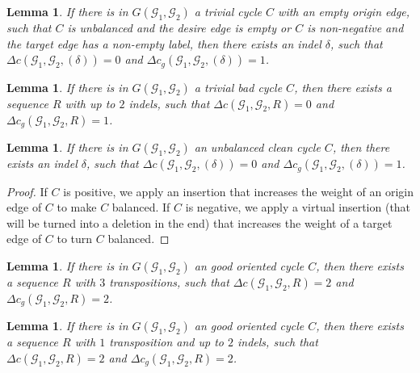 \documentclass[12pt]{article}
\newtheorem{lemma}[theorem]{Lemma}
\begin{document}
\vspace{8pt}
\begin{lemma}\cite[Lemma 5]{2021b-alexandrino-etal}\label{lemma:triv_1d}
If there is in $G(\mathcal{G}_1,\mathcal{G}_2)$ a trivial cycle $C$ with an empty origin edge, such that $C$ is unbalanced and the desire edge is empty or $C$ is non-negative and the target edge has a non-empty label, then there exists an indel $\delta$, such that $\Delta c(\mathcal{G}_1,\mathcal{G}_2,(\delta)) = 0$ and $\Delta c_g(\mathcal{G}_1,\mathcal{G}_2,(\delta)) = 1$.
\end{lemma}

\vspace{8pt}
\begin{lemma}\cite[Lemma 6]{2021b-alexandrino-etal}\label{lemma:triv_2d}
If there is in $G(\mathcal{G}_1,\mathcal{G}_2)$ a trivial bad cycle $C$, then there exists a sequence $R$ with up to $2$ indels, such that $\Delta c(\mathcal{G}_1,\mathcal{G}_2,R) = 0$ and $\Delta c_g(\mathcal{G}_1,\mathcal{G}_2,R) = 1$.
\end{lemma}

\vspace{8pt}
\begin{lemma}\label{lemma:unbal}
If there is in $G(\mathcal{G}_1,\mathcal{G}_2)$ an unbalanced clean cycle $C$, then there exists an indel $\delta$, such that $\Delta c(\mathcal{G}_1,\mathcal{G}_2,(\delta)) = 0$ and $\Delta c_g(\mathcal{G}_1,\mathcal{G}_2,(\delta)) = 1$.
\end{lemma}

\begin{proof}
If $C$ is positive, we apply an insertion that increases the weight of an origin edge of $C$ to make $C$ balanced. If $C$ is negative, we apply a virtual insertion (that will be turned into a deletion in the end) that increases the weight of a target edge of $C$ to turn $C$ balanced.
\end{proof}

\vspace{8pt}
\begin{lemma}\cite[Lemma 4.6]{2021a-oliveira-etal}\label{lemma:good_ori_3t}
If there is in $G(\mathcal{G}_1,\mathcal{G}_2)$ an good oriented cycle $C$, then there exists a sequence $R$ with $3$ transpositions, such that $\Delta c(\mathcal{G}_1,\mathcal{G}_2,R) = 2$ and $\Delta c_g(\mathcal{G}_1,\mathcal{G}_2,R) = 2$.
\end{lemma}

\vspace{8pt}
\begin{lemma}\label{lemma:good_ori_1t_2d}
If there is in $G(\mathcal{G}_1,\mathcal{G}_2)$ an good oriented cycle $C$, then there exists a sequence $R$ with $1$ transposition and up to $2$ indels, such that $\Delta c(\mathcal{G}_1,\mathcal{G}_2,R) = 2$ and $\Delta c_g(\mathcal{G}_1,\mathcal{G}_2,R) = 2$.
\end{lemma}
\end{document}
